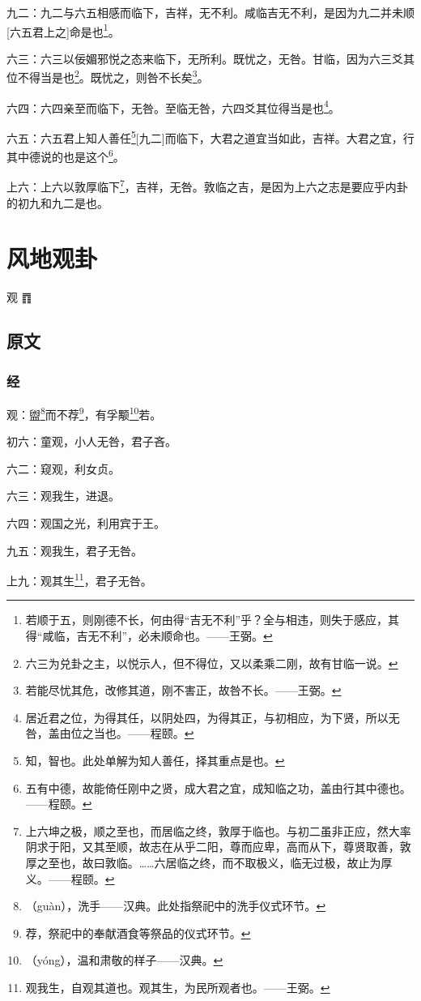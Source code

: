 \documentclass[12pt,oneside]{book}
\begin{document}
九二：九二与六五相感而临下，吉祥，无不利。咸临吉无不利，是因为九二并未顺[六五君上之]命是也\footnote{若顺于五，则刚德不长，何由得“吉无不利”乎？全与相违，则失于感应，其得“咸临，吉无不利”，必未顺命也。——王弼。}。

六三：六三以佞媚邪悦之态来临下，无所利。既忧之，无咎。甘临，因为六三爻其位不得当是也\footnote{六三为兑卦之主，以悦示人，但不得位，又以柔乘二刚，故有甘临一说。}。既忧之，则咎不长矣\footnote{若能尽忧其危，改修其道，刚不害正，故咎不长。——王弼。}。

六四：六四亲至而临下，无咎。至临无咎，六四爻其位得当是也\footnote{居近君之位，为得其任，以阴处四，为得其正，与初相应，为下贤，所以无咎，盖由位之当也。——程颐。}。

六五：六五君上知人善任\footnote{知，智也。此处单解为知人善任，择其重点是也。}[九二]而临下，大君之道宜当如此，吉祥。大君之宜，行其中德说的也是这个\footnote{五有中德，故能倚任刚中之贤，成大君之宜，成知临之功，盖由行其中德也。——程颐。}。

上六：上六以敦厚临下\footnote{上六坤之极，顺之至也，而居临之终，敦厚于临也。与初二虽非正应，然大率阴求于阳，又其至顺，故志在从乎二阳，尊而应卑，高而从下，尊贤取善，敦厚之至也，故曰敦临。……六居临之终，而不取极义，临无过极，故止为厚义。——程颐。}，吉祥，无咎。敦临之吉，是因为上六之志是要应乎内卦的初九和九二是也。



\chapter{风地观卦}
观 {\Large ䷓}

\section{原文}

\subsection{经}
观：盥\footnote{（guàn），洗手——汉典。此处指祭祀中的洗手仪式环节。}而不荐\footnote{荐，祭祀中的奉献酒食等祭品的仪式环节。}，有孚颙\footnote{（yóng），温和肃敬的样子——汉典。}若。

初六：童观，小人无咎，君子吝。

六二：窥观，利女贞。

六三：观我生，进退。

六四：观国之光，利用宾于王。

九五：观我生，君子无咎。

上九：观其生\footnote{观我生，自观其道也。观其生，为民所观者也。——王弼。}，君子无咎。
\end{document}
